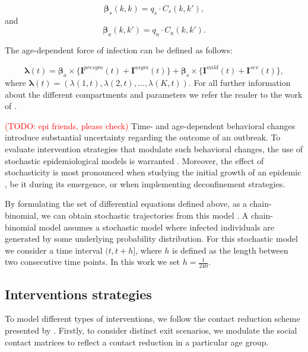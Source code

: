 \documentclass{article}
\renewcommand{\cite}[1]{\citep{#1}}
\newcommand\todo[1]{\textcolor{red}{(TODO: #1)}}
\newcommand{\proportionalityfactor}{q}
\newcommand{\agegroup}{k}
\newcommand{\agegroups}{K}
\begin{document}
\begin{equation}
\boldsymbol{\beta}_{s}(\agegroup, \agegroup) = \proportionalityfactor_{s} \cdot C_{s}(\agegroup, \agegroup'),    
\end{equation}
and
\begin{equation}
\boldsymbol{\beta}_{a}(\agegroup, \agegroup') = \proportionalityfactor_{a} \cdot C_{a}(\agegroup, \agegroup').  
\end{equation}

The age-dependent force of infection can be defined as follows:

\begin{equation}
    \boldsymbol{\lambda}(t) = \boldsymbol{\beta}_{a} \times \{ \textbf{I}^{presym}(t) + \textbf{I}^{asym}(t) \} +
    \boldsymbol{\beta}_{s} \times \{ \textbf{I}^{mild}(t) + \textbf{I}^{sev}(t) \},
\end{equation}
%
where $\boldsymbol{\lambda}(t) = (\lambda(1, t), \lambda(2, t), ..., \lambda(\agegroups, t))$. For all further information about the different compartments and parameters we refer the reader to the work of \citet{abrams2021modelling}.

\todo{epi friends, please check} Time- and age-dependent behavioral changes introduce substantial uncertainty regarding the outcome of an outbreak. To evaluate intervention strategies that modulate such behavioral changes, the use of stochastic epidemiological models is warranted \cite{abrams2021modelling}. Moreover, the effect of stochasticity is most pronounced when studying the initial growth of an epidemic \cite{britton2009epidemic}, be it during its emergence, or when implementing deconfinement strategies.

By formulating the set of differential equations defined above, as a chain-binomial, we can obtain stochastic trajectories from this model \cite{bailey1975mathematical}. A chain-binomial model assumes a stochastic model where infected individuals are generated by some underlying probability distribution. For this stochastic model we consider a time interval $(t, t +h]$, where $h$ is defined as the length between two consecutive time points. In this work we set $h = \frac{1}{240}$.

\subsection{Interventions strategies}
\label{sec:interventions}
To model different types of interventions, we follow the contact reduction scheme presented by \citet{abrams2021modelling}. Firstly, to consider distinct exit scenarios, we modulate the social contact matrices to reflect a contact reduction in a particular age group.
\end{document}

